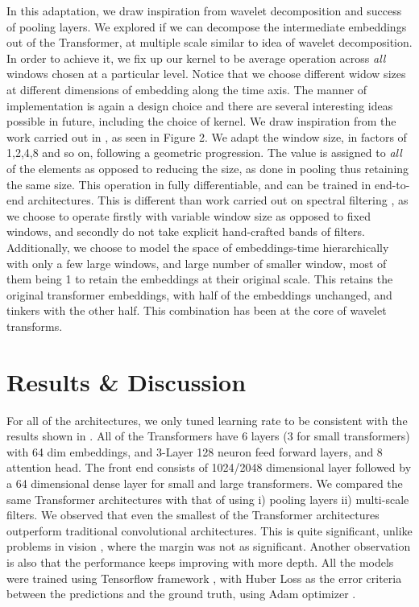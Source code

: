 \documentclass{article}
\begin{document}
\begin{sloppy}
In this adaptation, we draw inspiration from wavelet decomposition and success of pooling layers. We explored if we can decompose the intermediate embeddings out of the Transformer, at multiple scale similar to idea of wavelet decomposition. In order to achieve it, we fix up our kernel to be average operation across \textit{all} windows chosen at a particular level. Notice that we choose different widow sizes at different dimensions of embedding along the time axis.  The manner of implementation is again a design choice and there are several interesting ideas possible in future, including the choice of kernel. We draw inspiration from the work carried out in \cite{berger1994removing}, as seen in Figure 2. We adapt the window size, in factors of 1,2,4,8 and so on, following a geometric progression. The value is assigned to \textit{all} of the elements as opposed to reducing the size, as done in pooling thus retaining the same size. This operation in fully differentiable, and can be trained in end-to-end architectures. This is different than work carried out on spectral filtering \cite{tamkin2020language}, as we choose to operate firstly with variable window size as opposed to fixed windows, and secondly do not take explicit hand-crafted bands of filters. Additionally, we choose to model the space of embeddings-time hierarchically with only a few large windows, and large number of smaller window, most of them being 1 to retain the embeddings at their original scale. This retains the original transformer embeddings, with half of the embeddings unchanged, and tinkers with the other half. This combination has been at the core of wavelet transforms.

\section{Results \& Discussion}
For all of the architectures, we only tuned learning rate to be consistent with the results shown in \cite{fonseca2020fsd50k}. All of the Transformers have 6 layers (3 for small transformers) with 64 dim embeddings, and 3-Layer 128 neuron feed forward layers, and 8 attention head. The front end consists of 1024/2048 dimensional layer followed by a 64 dimensional dense layer for small and large transformers. We compared the same Transformer architectures with that of using i) pooling layers ii) multi-scale filters. We observed that even the smallest of the Transformer architectures outperform traditional convolutional architectures. This is quite significant,  unlike problems in vision \cite{dosovitskiy2020image}, where the margin was not as significant. Another observation is also that the performance keeps improving with more depth. All the models were trained using Tensorflow framework \cite{abadi2016tensorflow}, with Huber Loss as the error criteria between the predictions and the ground truth, using Adam optimizer \cite{kingma2014adam}. 


\end{sloppy}
\end{document}
